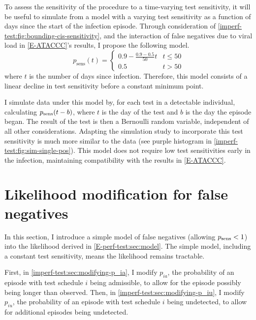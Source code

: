 \documentclass[thesis.tex]{subfiles}
\begin{document}
To assess the sensitivity of the procedure to a time-varying test sensitivity, it will be useful to simulate from a model with a varying test sensitivity as a function of days since the start of the infection episode.
Through consideration of \cref{imperf-test:fig:bounding-cis-sensitivity}, and the interaction of false negatives due to viral load in \cref{E-ATACCC}'s results, I propose the following model.
\begin{equation}
  p_\text{sens}(t) = \begin{cases}
    0.9 - \frac{0.9-0.5}{50}t &t \leq 50 \\
    0.5 &t > 50
  \end{cases}
  \label{imperf-test:eq:variable-test-sensitivity}
\end{equation}
where $t$ is the number of days since infection.
Therefore, this model consists of a linear decline in test sensitivity before a constant minimum point.

I simulate data under this model by, for each test in a detectable individual, calculating $p_\text{sens}(t-b)$, where $t$ is the day of the test and $b$ is the day the episode began.
The result of the test is then a Bernoulli random variable, independent of all other considerations.
Adapting the simulation study to incorporate this test sensitivity is much more similar to the data (see purple histogram in \cref{imperf-test:fig:sim-single-pos}).
This model does not require low test sensitivities early in the infection, maintaining compatibility with the results in \cref{E-ATACCC}.

\section{Likelihood modification for false negatives} \label{imperf-test:sec:modelling}

In this section, I introduce a simple model of false negatives (\ie allowing $p_\text{sens} < 1$) into the likelihood derived in \cref{E-perf-test:sec:model}.
The simple model, including a constant test sensitivity, means the likelihood remains tractable.

First, in \cref{imperf-test:sec:modifying-p_ia}, I modify $p_{ia}$, the probability of an episode with test schedule $i$ being admissible, to allow for the episode possibly being longer than observed.
Then, in \cref{imperf-test:sec:modifying-p_iu}, I modify $p_{iu}$, the probability of an episode with test schedule $i$ being undetected, to allow for additional episodes being undetected.
\end{document}
